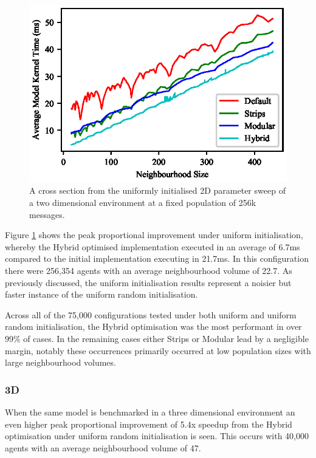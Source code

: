 \begin{figure}[!t]
\centering
\includegraphics[width=\linewidth]{../resources/results/2d/256k_messages_uniform.eps}
\caption{\label{fig:graph-2d-256k message-uniform}A cross section from the uniformly initialised 2D parameter sweep of a two dimensional environment at a fixed population of 256k messages.}
\end{figure}
      Figure \ref{fig:graph-2d-256k message-uniform} shows the peak proportional improvement under uniform initialisation, whereby the Hybrid optimised implementation executed in an average of 6.7ms compared to the initial implementation executing in 21.7ms. In this configuration there were 256,354 agents with an average neighbourhood volume of 22.7. As previously discussed, the uniform initialisation results represent a noisier but faster instance of the uniform random initialisation.
      
      Across all of the 75,000 configurations tested under both uniform and uniform random initialisation, the Hybrid optimisation was the most performant in over 99\% of cases. In the remaining cases either Strips or Modular lead by a negligible margin, notably these occurrences primarily occurred at low population sizes with large neighbourhood volumes.
      
    \subsubsection{3D}
      When the same model is benchmarked in a three dimensional environment an even higher peak proportional improvement of 5.4x speedup from the Hybrid optimisation under uniform random initialisation is seen. This occurs with 40,000 agents with an average neighbourhood volume of 47.
      
